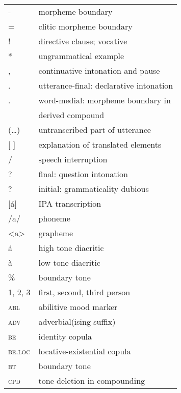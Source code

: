 \label{sec:abbr}
\begin{tabularx}{.45\textwidth}{lQ}
 {}- & morpheme boundary \\
 = & clitic morpheme boundary \\
 ! & directive clause; vocative \\
 * & ungrammatical example \\
 , & continuative intonation and pause \\
 . & utterance-final: declarative intonation \\
 . & word-medial: morpheme boundary in \\
& derived compound \\
 (…) & untranscribed part of utterance \\
{}[ ] & explanation of translated elements \\
 / & speech interruption \\
 ? & final: question intonation \\
 ? & initial: grammaticality dubious \\
{}[á] & IPA transcription \\
 /a/ & phoneme \\
 <a> & grapheme \\
 á & high tone diacritic \\
 à & low tone diacritic \\
 \% & boundary tone \\
 1, 2, 3 & first, second, third person \\
 \textsc{abl} & abilitive mood marker \\
 \textsc{adv} & adverbial(ising suffix) \\
 \textsc{be} & identity copula \\
 \textsc{be.loc} & locative-existential copula \\
 \textsc{bt} & boundary tone \\
 \textsc{cpd} & tone deletion in compounding \\
\end{tabularx}
